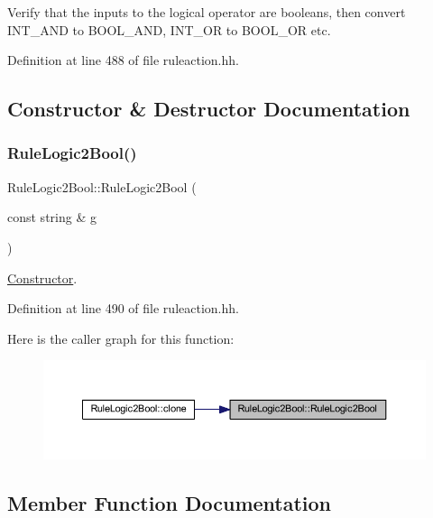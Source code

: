 Verify that the inputs to the logical operator are booleans, then convert I\+N\+T\+\_\+\+A\+ND to B\+O\+O\+L\+\_\+\+A\+ND, I\+N\+T\+\_\+\+OR to B\+O\+O\+L\+\_\+\+OR etc. 

Definition at line 488 of file ruleaction.\+hh.



\subsection{Constructor \& Destructor Documentation}
\mbox{\label{class_rule_logic2_bool_a6eccf6ebdd5c2ace03540bbaa1d89cdf}} 
\subsubsection{\texorpdfstring{RuleLogic2Bool()}{RuleLogic2Bool()}}
{\footnotesize\ttfamily Rule\+Logic2\+Bool\+::\+Rule\+Logic2\+Bool (\begin{DoxyParamCaption}\item[{const string \&}]{g }\end{DoxyParamCaption})\hspace{0.3cm}{\ttfamily [inline]}}



\mbox{\hyperlink{class_constructor}{Constructor}}. 



Definition at line 490 of file ruleaction.\+hh.

Here is the caller graph for this function\+:
\nopagebreak
\begin{figure}[H]
\begin{center}
\leavevmode
\includegraphics[width=350pt]{class_rule_logic2_bool_a6eccf6ebdd5c2ace03540bbaa1d89cdf_icgraph}
\end{center}
\end{figure}


\subsection{Member Function Documentation}
\mbox{\label{class_rule_logic2_bool_a1e63e4098d4474ca67d56d4e0118fb82}} 
